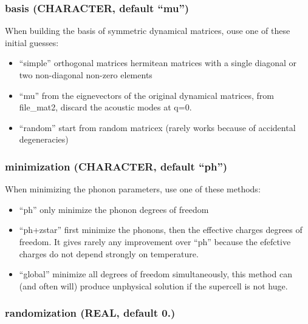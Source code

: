 \documentclass[
]{article}
\providecommand{\tightlist}{%
  \setlength{\itemsep}{0pt}\setlength{\parskip}{0pt}}
\begin{document}
\hypertarget{basis-character-default-mu}{%
\subsubsection{\texorpdfstring{basis (CHARACTER, default
\enquote{mu})}{basis (CHARACTER, default ``mu'')}}\label{basis-character-default-mu}}

When building the basis of symmetric dynamical matrices, ouse one of
these initial guesses:

\begin{itemize}
\tightlist
\item
  \enquote{simple} orthogonal matrices hermitean matrices with a single
  diagonal or two non-diagonal non-zero elements
\item
  \enquote{mu} from the eignevectors of the original dynamical matrices,
  from file\_mat2, discard the acoustic modes at q=0.
\item
  \enquote{random} start from random matricex (rarely works because of
  accidental degeneracies)
\end{itemize}

\hypertarget{minimization-character-default-ph}{%
\subsubsection{\texorpdfstring{minimization (CHARACTER, default
\enquote{ph})}{minimization (CHARACTER, default ``ph'')}}\label{minimization-character-default-ph}}

When minimizing the phonon parameters, use one of these methods:

\begin{itemize}
\tightlist
\item
  \enquote{ph} only minimize the phonon degrees of freedom
\item
  \enquote{ph+zstar} first minimize the phonons, then the effective
  charges degrees of freedom. It gives rarely any improvement over
  \enquote{ph} because the efefctive charges do not depend strongly on
  temperature.
\item
  \enquote{global} minimize all degrees of freedom simultaneously, this
  method can (and often will) produce unphysical solution if the
  supercell is not huge.
\end{itemize}

\hypertarget{randomization-real-default-0.}{%
\subsubsection{randomization (REAL, default
0.)}\label{randomization-real-default-0.}}
\end{document}
